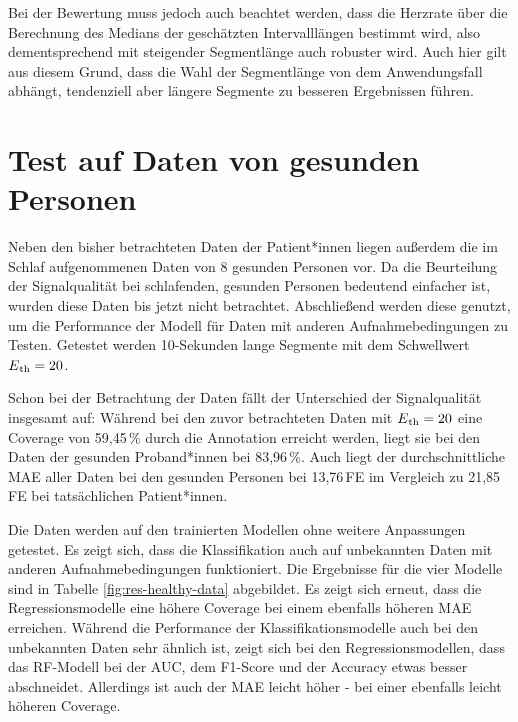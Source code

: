  Bei der Bewertung muss jedoch auch beachtet werden, dass die Herzrate über die Berechnung des Medians der geschätzten Intervalllängen bestimmt wird, also dementsprechend mit steigender Segmentlänge auch robuster wird. Auch hier gilt aus diesem Grund, dass die Wahl der Segmentlänge von dem Anwendungsfall abhängt, tendenziell aber längere Segmente zu besseren Ergebnissen führen.

\section{Test auf Daten von gesunden Personen}

Neben den bisher betrachteten Daten der Patient*innen liegen außerdem die im Schlaf aufgenommenen Daten von 8 gesunden Personen vor. Da die Beurteilung der Signalqualität bei schlafenden, gesunden Personen bedeutend einfacher ist, wurden diese Daten bis jetzt nicht betrachtet. Abschließend werden diese genutzt, um die Performance der Modell für Daten mit anderen Aufnahmebedingungen zu Testen. Getestet werden 10-Sekunden lange Segmente mit dem Schwellwert $E\textsubscript{th} = 20$.

Schon bei der Betrachtung der Daten fällt der Unterschied der Signalqualität insgesamt auf: Während bei den zuvor betrachteten Daten mit $E\textsubscript{th} = 20$ eine Coverage von 59,45\,\% durch die Annotation erreicht werden, liegt sie bei den Daten der gesunden Proband*innen bei 83,96\,\%. Auch liegt der durchschnittliche \ac{MAE} aller Daten bei den gesunden Personen bei 13,76\,\si{FE} im Vergleich zu 21,85\,\si{FE} bei tatsächlichen Patient*innen.

Die Daten werden auf den trainierten Modellen ohne weitere Anpassungen getestet. Es zeigt sich, dass die Klassifikation auch auf unbekannten Daten mit anderen Aufnahmebedingungen funktioniert. Die Ergebnisse für die vier Modelle sind in Tabelle \ref{fig:res-healthy-data} abgebildet. Es zeigt sich erneut, dass die Regressionsmodelle eine höhere Coverage bei einem ebenfalls höheren \ac{MAE} erreichen. Während die Performance der Klassifikationsmodelle auch bei den unbekannten Daten sehr ähnlich ist, zeigt sich bei den Regressionsmodellen, dass das \ac{RF}-Modell bei der \ac{AUC}, dem F1-Score und der Accuracy etwas besser abschneidet. Allerdings ist auch der \ac{MAE} leicht höher - bei einer ebenfalls leicht höheren Coverage.

